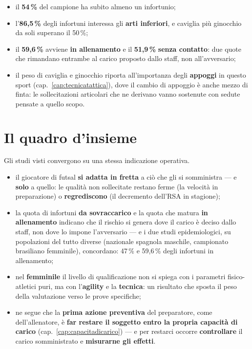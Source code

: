 \begin{itemize}
  \item il \textbf{54\,\%} del campione ha subito almeno un infortunio;
  \item l'\textbf{86,5\,\%} degli infortuni interessa gli \textbf{arti inferiori}, e caviglia più
    ginocchio da soli superano il 50\,\%;
  \item il \textbf{59,6\,\%} avviene \textbf{in allenamento} e il \textbf{51,9\,\%}
    \textbf{senza contatto}: due quote che rimandano entrambe al carico proposto dallo staff, non
    all'avversario;
  \item il peso di caviglia e ginocchio riporta all'importanza degli \textbf{appoggi} in questo
    sport (cap.~\ref{cap:tecnicatattica}), dove il cambio di appoggio è anche mezzo di finta: le
    sollecitazioni articolari che ne derivano vanno sostenute con sedute pensate a quello scopo.
\end{itemize}

\section{Il quadro d'insieme}

Gli studi visti convergono su una stessa indicazione operativa.

\begin{itemize}
  \item il giocatore di futsal \textbf{si adatta in fretta} a ciò che gli si somministra --- e
    \textbf{solo} a quello: le qualità non sollecitate restano ferme (la velocità in preparazione)
    o \textbf{regrediscono} (il decremento dell'RSA in stagione);
  \item la quota di infortuni \textbf{da sovraccarico} e la quota che matura \textbf{in
    allenamento} indicano che il rischio si genera dove il carico è deciso dallo staff, non dove
    lo impone l'avversario --- e i due studi epidemiologici, su popolazioni del tutto diverse
    (nazionale spagnola maschile, campionato brasiliano femminile), concordano: 47\,\% e
    59,6\,\% degli infortuni in allenamento;
  \item nel \textbf{femminile} il livello di qualificazione non si spiega con i parametri
    fisico-atletici puri, ma con l'\textbf{agility} e la \textbf{tecnica}: un risultato che sposta
    il peso della valutazione verso le prove specifiche;
  \item ne segue che la \textbf{prima azione preventiva} del preparatore, come dell'allenatore, è
    \textbf{far restare il soggetto entro la propria capacità di carico}
    (cap.~\ref{cap:capacitadicarico}) --- e per restarci occorre \textbf{controllare} il carico
    somministrato e \textbf{misurarne gli effetti}.
\end{itemize}

